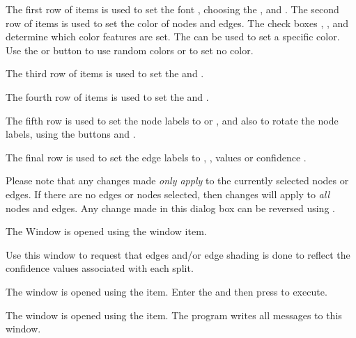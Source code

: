 \documentclass[11pt]{article}
\begin{document}
The first row of items is used to set the font , choosing the ,
 and .
The second row of items is used to set the color  of nodes and edges.
The check boxes  , ,  and 
determine which color features are set.
The  can be used to set a specific color. Use the   or 
button to use random colors or to set no color.

The third row of items is used to set the  and .

The fourth row of items is used to set the  and .

The fifth row is used to set the node labels to  or , and also to rotate the node labels,
using the buttons  and .

The final row is used to set the edge labels to , ,  values or
confidence .

Please note that any changes made {\em only apply} to the currently selected
nodes or edges. If there are no edges or nodes selected, then changes will apply
to {\em all} nodes and edges. Any change made in this dialog box can be reversed using
.


The  Window is opened using the
 window item.

Use this window to request that edges and/or edge shading
is done to reflect the confidence values associated with
each split.


The  window is opened using the
 item.
Enter the  and then press 
to execute.



The  window is opened using the
 item.
The program writes all messages to this window.
\end{document}

